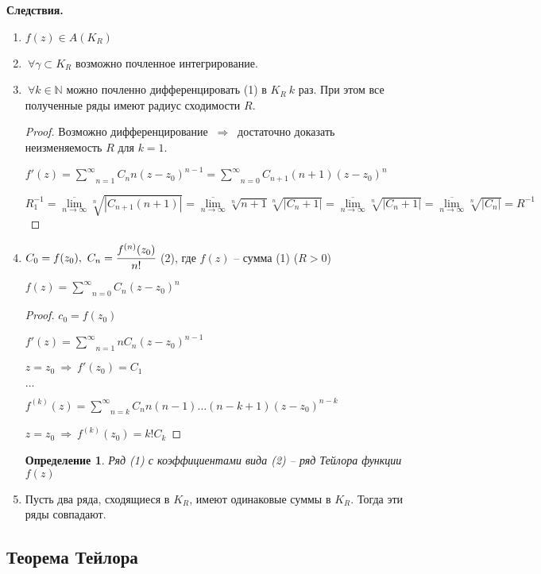 \documentclass[final]{report}
\newcommand{\then}{\ \Rightarrow\ }
\newcommand{\N}{\mathbb{N}}
\newcommand{\msum}[2]{\underset{#1}{\overset{#2}{\sum}}}
\newcommand{\rsum}{\msum{n=1}{\infty}}
\newcommand{\ssum}{\msum{n=0}{\infty}}
\newcommand{\mlim}[1]{\underset{#1}{\lim}}
\newcommand{\g}{\gamma}
\newcommand{\F}{\ \forall}
\newcommand{\opr}[1]{\begin{opred}#1\end{opred}}
\newtheorem*{opred}{Определение}
\theoremstyle{remark}
\begin{document}
{\bfseries Следствия.}
\begin{enumerate}
\item $f(z)\in A(K_R)$
\item $\F\g\subset K_R$ возможно почленное интегрирование.
\item $\F k\in\N$ можно почленно дифференцировать (1) в $K_R\ k$ раз. При этом все полученные ряды имеют радиус сходимости $R$.
\begin{proof}
Возможно дифференцирование $\then$ достаточно доказать неизменяемость $R$ для $k=1$.

$f'(z)=\rsum C_n n(z-z_0)^{n-1}=\ssum C_{n+1}(n+1)(z-z_0)^n$

$R^{-1}_1=\overline{\mlim{n\to\infty}}\sqrt[n]{|C_{n+1}(n+1)|}=\overline{\mlim{n\to\infty}}\sqrt[n]{n+1}\sqrt[n]{|C_n+1|}=\overline{\mlim{n\to\infty}}\sqrt[n]{|C_n+1|}=\overline{\mlim{n\to\infty}}\sqrt[n]{|C_n|}=R^{-1}$
\end{proof}
\item $C_0=f(z_0),\ C_n=\cfrac{f^{(n)}(z_0)}{n!}$ (2), где $f(z)$ -- сумма (1) ($R>0$)

$f(z)=\ssum C_n(z-z_0)^n$
\begin{proof}
$c_0=f(z_0)$

$f'(z)=\rsum nC_n(z-z_0)^{n-1}$

$z=z_0\then f'(z_0)=C_1$

$\ldots$

$f^{(k)}(z)=\msum{n=k}{\infty}C_nn(n-1)\ldots(n-k+1)(z-z_0)^{n-k}$

$z=z_0\then f^{(k)}(z_0)=k!C_k$
\end{proof}
\opr{Ряд (1) с коэффициентами вида (2) -- ряд Тейлора функции $f(z)$}
\item Пусть два ряда, сходящиеся в $K_R$, имеют одинаковые суммы в $K_R$. Тогда эти ряды совпадают.
\end{enumerate}

\newpage

\subsection{Теорема Тейлора}
\end{document}
